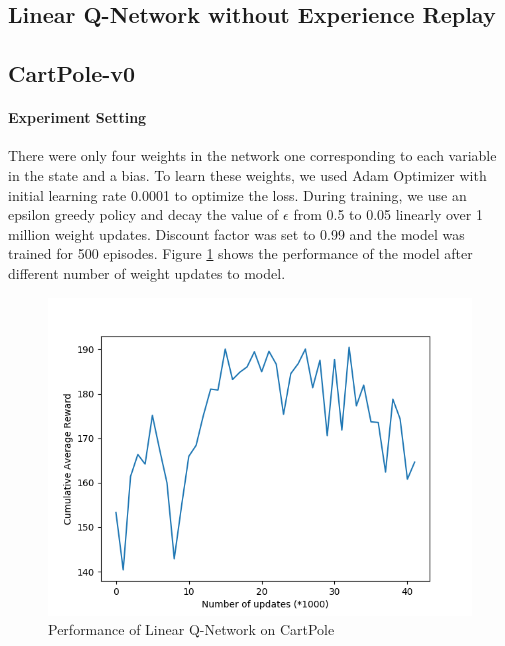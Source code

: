 \documentclass[12pt]{article}
\begin{document}
\pagebreak[4]

\subsection{Linear Q-Network without Experience Replay}
\subsection*{CartPole-v0}
\paragraph{Experiment Setting} There were only four weights in the network one corresponding to each variable in the state and a bias. To learn these weights, we used Adam Optimizer with initial learning rate 0.0001 to optimize the loss. During training, we use an epsilon greedy policy and decay the value of $\epsilon$ from 0.5 to 0.05 linearly over 1 million weight updates. Discount factor was set to 0.99 and the model was trained for 500 episodes. Figure \ref{fig:01} shows the performance of the model after different number of weight updates to model.
\begin{figure}[h]
  \centering
  \vspace{-5mm}
  \includegraphics[width=0.8\linewidth]{figures/reward_plot_01.png}
  \caption{Performance of Linear Q-Network on CartPole}
  \label{fig:01}
\end{figure}
\end{document}
